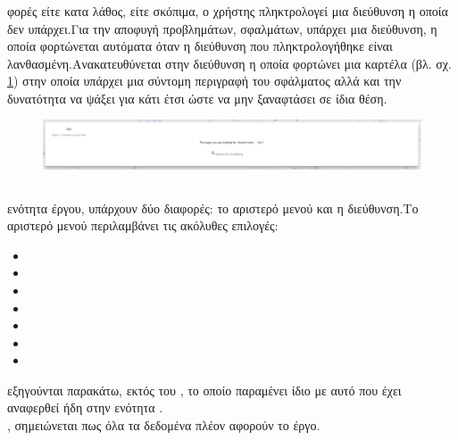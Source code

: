 \subsubsection*{}
 φορές είτε κατα λάθος, είτε σκόπιμα, ο χρήστης πληκτρολογεί μια διεύθυνση η οποία δεν υπάρχει.Για την αποφυγή προβλημάτων, σφαλμάτων, υπάρχει μια διεύθυνση, η οποία φορτώνεται αυτόματα όταν η διεύθυνση που πληκτρολογήθηκε είναι λανθασμένη.Ανακατευθύνεται στην διεύθυνση  η οποία φορτώνει μια καρτέλα (βλ. σχ. \ref{fig:404}) στην οποία υπάρχει μια σύντομη περιγραφή του σφάλματος αλλά και την δυνατότητα να ψάξει για κάτι έτσι ώστε να μην ξαναφτάσει σε ίδια θέση.

\begin{figure}[!htb]
\includegraphics[width=\linewidth]{images/404.png}
\caption{}
\label{fig:404}
\end{figure}


\pagebreak

\subsection{}
 ενότητα έργου, υπάρχουν δύο διαφορές: το αριστερό μενού και η διεύθυνση.Το αριστερό μενού περιλαμβάνει τις ακόλυθες επιλογές:\\
\begin{itemize}
	\item {}
	\item {}
	\item {}
	\item {}
	\item {}
	\item {}
	\item {}
\end{itemize}
 εξηγούνται παρακάτω, εκτός του , το οποίο παραμένει ίδιο με αυτό που έχει αναφερθεί ήδη στην ενότητα .\\
, σημειώνεται πως όλα τα δεδομένα πλέον αφορούν το έργο.

